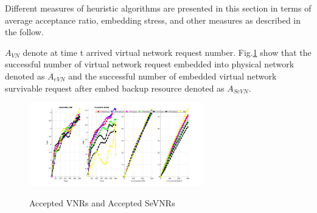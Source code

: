 Different measures \cite{fischer2013virtual} of heuristic algorithms are presented in this section in terms of average acceptance ratio, embedding stress, and other measures as described in the follow.

$A_{VN}$ denote at time t arrived virtual network request number. Fig.\ref{fig:VirNetReqSurNetReq} show that the successful number of virtual network request  embedded into physical network denoted as $A_{eVN}$ and the successful number of embedded virtual network survivable request after embed backup resource denoted as $A_{SeVN}$.

\begin{figure}
  \centering
  \includegraphics[width=3in]{Fig/VirNetReqSurNetReq}\\
  \caption{Accepted VNRs and Accepted SeVNRs}\label{fig:VirNetReqSurNetReq}
\end{figure}

